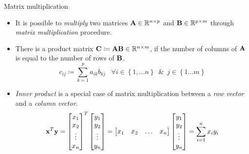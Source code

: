 \documentclass[aspectratio=169]{beamer}
\def\mf{\ensuremath\mathbf}
\begin{document}
\begin{frame}[t]{Matrix multiplication}
\begin{itemize}
\item It is possible to \textit{multiply} two matrices $\mf{A} \in \mathbb{R}^{n\times p}$ and $\mf{B} \in \mathbb{R}^{p\times m}$ through \textit{matrix multiplication} procedure.
\item There is a product matrix $\mf{C} \coloneqq \mf{A}\mf{B} \in \mathbb{R}^{n \times m}$, if the number of columns of $\mf{A}$ is equal to the number of rows of $\mf{B}$.
\[ c_{ij} \coloneqq \sum_{k=1}^{p} a_{ik}b_{kj} \,\,\,\,\, \forall i \in \left\{1, \ldots n\right\} \,\,\, \& \,\,\, j \in \left\{1 \ldots m\right\} \]
\item \textit{Inner product} is a special case of matrix multiplication between a \textit{row vector} and a \textit{column vector}.
\[ \mf{x}^T\mf{y} = \begin{bmatrix}
x_1 \\ x_2 \\ \vdots \\x_n
\end{bmatrix}^T\begin{bmatrix}
y_1 \\ y_2 \\ \vdots \\y_n
\end{bmatrix} = \begin{bmatrix}
x_1 & x_2 & \ldots &x_n
\end{bmatrix}\begin{bmatrix}
y_1 \\ y_2 \\ \vdots \\y_n
\end{bmatrix} = \sum_{i=1}^nx_iy_i\]
\end{itemize}
\end{frame}
\end{document}
